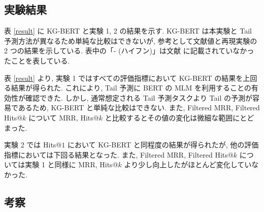\subsection{実験結果}

表 \ref{result} に KG-BERT と実験 1, 2 の結果を示す. KG-BERT は本実験と Tail 予測方法が異なるため単純な比較はできないが, 参考として文献値と再現実験の 2 つの結果を示している. 表中の「- (ハイフン)」は文献 \cite{KG-BERT} に記載されていなかったことを表している. \par

\begin{table}[t]
    \centering
    \caption{KG-BERT と実験 1, 2 の結果}
    \label{result}
\end{table}

表 \ref{result} より, 実験 1 ではすべての評価指標において KG-BERT の結果を上回る結果が得られた. これにより, Tail 予測に BERT の MLM を利用することの有効性が確認できた. しかし, 通常想定される Tail 予測タスクより Tail の予測が容易であるため, KG-BERT と単純な比較はできない. また, Filtered MRR, Filtered Hits@$k$ について MRR, Hits@$k$ と比較するとその値の変化は微細な範囲にとどまった. \par
実験 2 では Hits@$1$ において KG-BERT と同程度の結果が得られたが, 他の評価指標においては下回る結果となった. また, Filtered MRR, Filtered Hits@$k$ については実験 1 と同様に MRR, Hits@$k$ より少し向上したがほとんど変化していなかった. \par

\subsection{考察}

